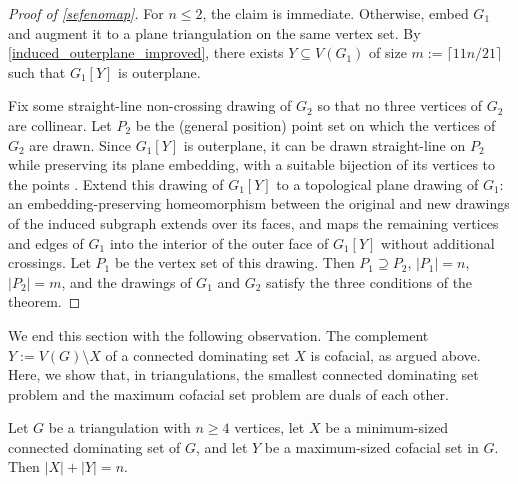 \documentclass{patmorin}
\begin{document}
\begin{proof}[Proof of \cref{sefenomap}]
For $n\le2$, the claim is immediate. Otherwise, embed $G_1$ and augment it to a plane triangulation on the same vertex set.  By \cref{induced_outerplane_improved}, there exists $Y\subseteq V(G_1)$ of size $m:=\lceil11n/21\rceil$ such that $G_1[Y]$ is outerplane.

Fix some straight-line non-crossing drawing of $G_2$ so that no three vertices of $G_2$ are collinear. Let $P_2$ be the (general position) point set on which the vertices of $G_2$ are drawn.  Since $G_1[Y]$ is outerplane, it can be drawn straight-line on $P_2$ while preserving its plane embedding, with a suitable bijection of its vertices to the points \cite{angelini.evans.ea:sefe}. Extend this drawing of $G_1[Y]$ to a topological plane drawing of $G_1$: an embedding-preserving homeomorphism between the original and new drawings of the induced subgraph extends over its faces, and maps the remaining vertices and edges of $G_1$ into the interior of the outer face of $G_1[Y]$ without additional crossings. Let $P_1$ be the vertex set of this drawing. Then $P_1\supseteq P_2$, $|P_1|=n$, $|P_2|=m$, and the drawings of $G_1$ and $G_2$ satisfy the three conditions of the theorem.
\end{proof}

We end this section with the following observation. The complement $Y:=V(G)\setminus X$ of a connected dominating set $X$ is cofacial, as argued above.  Here, we show that, in triangulations, the smallest connected dominating set problem and the maximum cofacial set problem are duals of each other.

\begin{thm}\label{cofacial_equivalence}
  Let $G$ be a triangulation with $n\ge4$ vertices, let $X$ be a minimum-sized connected dominating set of $G$, and let $Y$ be a maximum-sized cofacial set in $G$. Then $|X|+|Y|=n$.
\end{thm}
\end{document}
